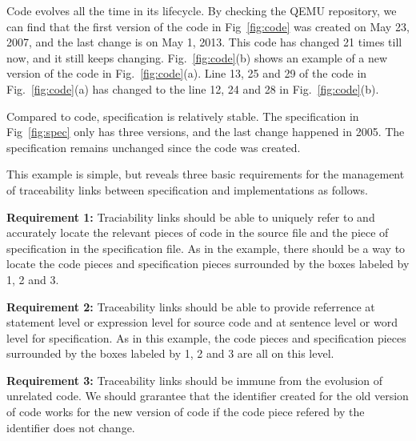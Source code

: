 Code evolves all the time in its lifecycle. By checking the QEMU repository, we can find that the first version of the code in Fig~\ref{fig:code} was created on May 23, 2007, and the last change is on May 1, 2013. This code has changed 21 times till now, and it still keeps changing. 
Fig.~\ref{fig:code}(b) shows an example of a new version of the code in Fig.~\ref{fig:code}(a). Line 13, 25 and 29 of the code in Fig.~\ref{fig:code}(a) has changed to the line 12, 24 and 28 in Fig.~\ref{fig:code}(b).

Compared to code, specification is relatively stable. The specification in Fig~\ref{fig:spec} only has three versions, and the last change happened in 2005. The specification remains unchanged since the code was created.

This example is simple, but reveals three basic requirements for the management of traceability links between specification and implementations as follows.

\textbf{Requirement 1:} Traciability links should be able to uniquely refer to and accurately locate the relevant pieces of code in the source file and the piece of specification in the specification file. As in the example, there should be a way to locate the code pieces and specification pieces surrounded by the boxes labeled by 1, 2 and 3.

\textbf{Requirement 2:} Traceability links should be able to provide referrence at statement level or expression level for source code and at sentence level or word level for specification. As in this example, the code pieces and specification pieces surrounded by the boxes labeled by 1, 2 and 3 are all on this level.

\textbf{Requirement 3:} Traceability links should be immune from the evolusion of unrelated code. We should grarantee that the identifier created for the old version of code works for the new version of code if the code piece refered by the identifier does not change.

